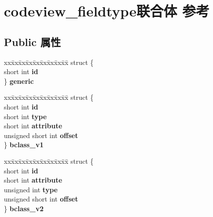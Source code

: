 \hypertarget{unioncodeview__fieldtype}{}\section{codeview\+\_\+fieldtype联合体 参考}
\label{unioncodeview__fieldtype}
\subsection*{Public 属性}
\begin{DoxyCompactItemize}
\item 
\mbox{\label{unioncodeview__fieldtype_a67a54d8ce6a770c90b66646af7b1f977}} 
\begin{tabbing}
xx\=xx\=xx\=xx\=xx\=xx\=xx\=xx\=xx\=\kill
struct \{\\
\>short int {\bfseries id}\\
\} {\bfseries generic}\\

\end{tabbing}\item 
\mbox{\label{unioncodeview__fieldtype_a79da71dca8c94ffe389691f7271f897f}} 
\begin{tabbing}
xx\=xx\=xx\=xx\=xx\=xx\=xx\=xx\=xx\=\kill
struct \{\\
\>short int {\bfseries id}\\
\>short int {\bfseries type}\\
\>short int {\bfseries attribute}\\
\>unsigned short int {\bfseries offset}\\
\} {\bfseries bclass\_v1}\\

\end{tabbing}\item 
\mbox{\label{unioncodeview__fieldtype_ab9ab406109dda19f1a7a2758129c46d4}} 
\begin{tabbing}
xx\=xx\=xx\=xx\=xx\=xx\=xx\=xx\=xx\=\kill
struct \{\\
\>short int {\bfseries id}\\
\>short int {\bfseries attribute}\\
\>unsigned int {\bfseries type}\\
\>unsigned short int {\bfseries offset}\\
\} {\bfseries bclass\_v2}\\


\end{tabbing}
\end{DoxyCompactItemize}
